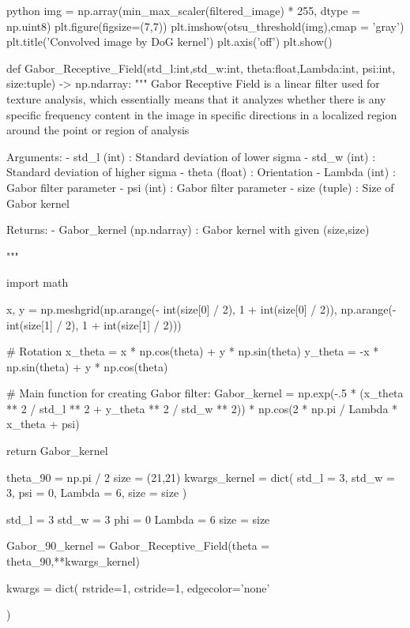 \documentclass[12pt]{amsart}
\begin{document}
\begin{mintedbox}{python}
img = np.array(min_max_scaler(filtered_image) * 255, dtype = np.uint8)
plt.figure(figsize=(7,7))
plt.imshow(otsu_threshold(img),cmap = 'gray')
plt.title('Convolved image by DoG kernel')
plt.axis('off')
plt.show()

def Gabor_Receptive_Field(std_l:int,std_w:int,
                          theta:float,Lambda:int,
                          psi:int, size:tuple) -> np.ndarray:
    """
        Gabor Receptive Field is a linear filter used for texture analysis, which essentially             means that it analyzes whether there is any specific frequency content in the image in            specific directions in a localized region around the point or region of analysis


            Arguments:
                - std_l  (int)   : Standard deviation of lower sigma
                - std_w  (int)   : Standard deviation of higher sigma                
                - theta  (float) : Orientation
                - Lambda (int)   : Gabor filter parameter 
                - psi    (int)   : Gabor filter parameter
                - size   (tuple) : Size of Gabor kernel

            Returns:
               - Gabor_kernel (np.ndarray) : Gabor kernel with given (size,size)

    """


    import math

    x, y = np.meshgrid(np.arange(- int(size[0] / 2), 1 + int(size[0] / 2)),
                       np.arange(- int(size[1] / 2), 1 + int(size[1] / 2)))


    # Rotation
    x_theta = x * np.cos(theta) + y * np.sin(theta)
    y_theta = -x * np.sin(theta) + y * np.cos(theta)

    # Main function for creating Gabor filter:
    Gabor_kernel = np.exp(-.5 * (x_theta ** 2 / std_l ** 2 + y_theta ** 2 / std_w ** 2)) * np.cos(2 * np.pi / Lambda * x_theta + psi)


    return Gabor_kernel

theta_90 = np.pi / 2
size = (21,21)
kwargs_kernel = dict(
        std_l = 3,
        std_w = 3,
        psi = 0,
        Lambda = 6,
        size = size
)

std_l = 3
std_w = 3
phi = 0
Lambda = 6
size = size

Gabor_90_kernel = Gabor_Receptive_Field(theta = theta_90,**kwargs_kernel)


kwargs = dict(
    rstride=1,
    cstride=1,     
    edgecolor='none'

)


\end{mintedbox}
\end{document}
